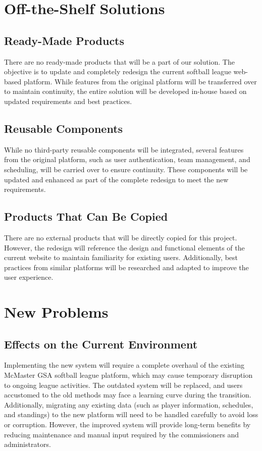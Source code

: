 \documentclass[12pt]{article}
\begin{document}
\section{Off-the-Shelf Solutions}
\subsection{Ready-Made Products}
There are no ready-made products that will be a part of our solution. The objective is to update and completely redesign the current softball league web-based platform. While features from the original platform will be transferred over to maintain continuity, the entire solution will be developed in-house based on updated requirements and best practices.

\subsection{Reusable Components}
While no third-party reusable components will be integrated, several features from the original platform, such as user authentication, team management, and scheduling, will be carried over to ensure continuity. These components will be updated and enhanced as part of the complete redesign to meet the new requirements.

\subsection{Products That Can Be Copied}
There are no external products that will be directly copied for this project. However, the redesign will reference the design and functional elements of the current website to maintain familiarity for existing users. Additionally, best practices from similar platforms will be researched and adapted to improve the user experience.


\section{New Problems}
\subsection{Effects on the Current Environment}
Implementing the new system will require a complete overhaul of the existing McMaster GSA softball league platform, which may cause temporary disruption to ongoing league activities. The outdated system will be replaced, and users accustomed to the old methods may face a learning curve during the transition. Additionally, migrating any existing data (such as player information, schedules, and standings) to the new platform will need to be handled carefully to avoid loss or corruption. However, the improved system will provide long-term benefits by reducing maintenance and manual input required by the commissioners and administrators. 
\end{document}
